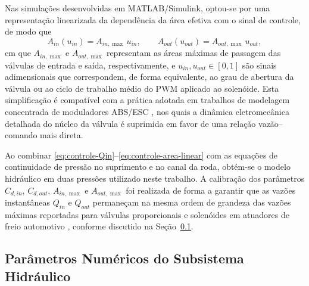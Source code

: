 Nas simulações desenvolvidas em MATLAB/Simulink, optou-se por uma representação linearizada da dependência da área efetiva com o sinal de controle, de modo que
\begin{equation}
    A_{in}(u_{in}) = A_{in,\max}\,u_{in}, \qquad
    A_{out}(u_{out}) = A_{out,\max}\,u_{out},
    \label{eq:controle-area-linear}
\end{equation}
em que $A_{in,\max}$ e $A_{out,\max}$ representam as áreas máximas de passagem das válvulas de entrada e saída, respectivamente, e $u_{in},u_{out} \in [0,1]$ são sinais adimensionais que correspondem, de forma equivalente, ao grau de abertura da válvula ou ao ciclo de trabalho médio do PWM aplicado ao solenóide. Esta simplificação é compatível com a prática adotada em trabalhos de modelagem concentrada de moduladores ABS/ESC \cite{Hardware-in-the-loop-simulation-of-pressure-difference-limiting-modulation-of-the-hydraulic-brake-for-regenerative-braking-control-of-the-hydraulic-brake-for-regenerative-braking-control-of-electric-vehicles.pdf,OK-High-Precision_Hydraulic_Pressure_Control_Based_on_Linear_Pressure-Drop_Modulation_in_Valve_Critical_Equilibrium_State.pdf}, nos quais a dinâmica eletromecânica detalhada do núcleo da válvula é suprimida em favor de uma relação vazão–comando mais direta.

Ao combinar \eqref{eq:controle-Qin}–\eqref{eq:controle-area-linear} com as equações de continuidade de pressão no suprimento e no canal da roda, obtém-se o modelo hidráulico em duas pressões utilizado neste trabalho. A calibração dos parâmetros $C_{d,in}$, $C_{d,out}$, $A_{in,\max}$ e $A_{out,\max}$ foi realizada de forma a garantir que as vazões instantâneas $Q_{in}$ e $Q_{out}$ permaneçam na mesma ordem de grandeza das vazões máximas reportadas para válvulas proporcionais e solenóides em atuadores de freio automotivo \cite{Development-of-Proportional-Pressure-Control-Valve-for-Hydraulic-Braking-Actuator-of-Automobile-ABS.pdf,OK-High-Precision_Hydraulic_Pressure_Control_Based_on_Linear_Pressure-Drop_Modulation_in_Valve_Critical_Equilibrium_State.pdf}, conforme discutido na Seção~\ref{sec:controle-4-1-5}.


\subsection{Parâmetros Numéricos do Subsistema Hidráulico}
\label{sec:controle-4-1-5}

